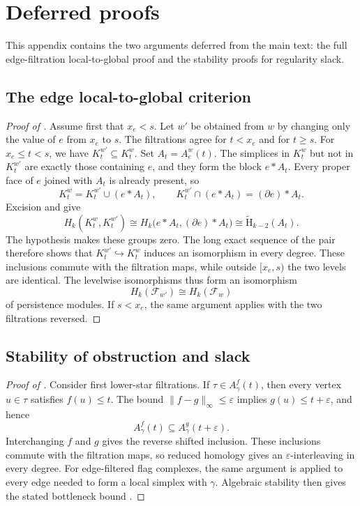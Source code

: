 \documentclass[11pt,letterpaper]{article}
\theoremstyle{definition}
\newcommand{\redH}{\widetilde{\mathrm H}}
\newcommand{\eps}{\varepsilon}
\begin{document}
\appendix
\section{Deferred proofs}
\label{app:missing-proofs}

This appendix contains the two arguments deferred from the main text: the full
edge-filtration local-to-global proof and the stability proofs for regularity
slack.

\subsection{The edge local-to-global criterion}
\label{app:flag-local-global-proof}

\begin{proof}[Proof of ]
Assume first that $x_e<s$. Let $w'$ be obtained from $w$ by changing only the
value of $e$ from $x_e$ to $s$. The filtrations agree for $t<x_e$ and for
$t\geq s$. For $x_e\leq t<s$, we have $K_t^{w'}\subseteq K_t^w$. Set
$A_t=A_e^w(t)$. The simplices in $K_t^w$ but not in $K_t^{w'}$ are exactly
those containing $e$, and they form the block $e*A_t$. Every proper face of
$e$ joined with $A_t$ is already present, so
$$
K_t^w=K_t^{w'}\cup(e*A_t),
\qquad
K_t^{w'}\cap(e*A_t)=(\partial e)*A_t.
$$
Excision and  give
$$
H_k(K_t^w,K_t^{w'})
\cong
H_k\bigl(e*A_t,(\partial e)*A_t\bigr)
\cong\redH_{k-2}(A_t).
$$
The hypothesis makes these groups zero. The long exact sequence of the pair
therefore shows that $K_t^{w'}\hookrightarrow K_t^w$ induces an isomorphism
in every degree. These inclusions commute with the filtration maps, while
outside $[x_e,s)$ the two levels are identical. The levelwise isomorphisms
thus form an isomorphism
$$
H_k(\mathcal F_{w'})\cong H_k(\mathcal F_w)
$$
of persistence modules. If $s<x_e$, the same argument applies with the two
filtrations reversed.
\end{proof}

\subsection{Stability of obstruction and slack}
\label{app:stability-proofs}

\begin{proof}[Proof of ]
Consider first lower-star filtrations. If
$\tau\in A_\gamma^f(t)$, then every vertex $u\in\tau$ satisfies
$f(u)\leq t$. The bound $\|f-g\|_\infty\leq\eps$ implies
$g(u)\leq t+\eps$, and hence
$$
A_\gamma^f(t)\subseteq A_\gamma^g(t+\eps).
$$
Interchanging $f$ and $g$ gives the reverse shifted inclusion. These
inclusions commute with the filtration maps, so reduced homology gives an
$\eps$-interleaving in every degree. For edge-filtered flag complexes, the
same argument is applied to every edge needed to form a local simplex with
$\gamma$. Algebraic stability then gives the stated bottleneck bound
\cite{ChazalEtAl2016,Lesnick2015}.
\end{proof}
\end{document}
